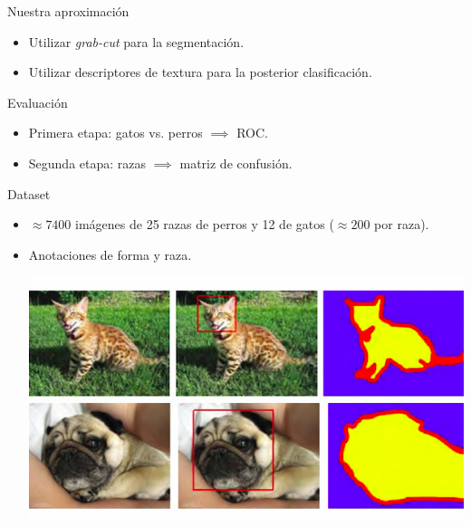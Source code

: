 \documentclass{beamer}
\begin{document}
\begin{frame}{Nuestra aproximación}
    \begin{itemize}
        \item Utilizar \emph{grab-cut} para la segmentación.
            \pause
        \item Utilizar descriptores de textura para la posterior
            clasificación.
    \end{itemize}
\end{frame}
\begin{frame}{Evaluación}
    \begin{itemize}
        \item Primera etapa: gatos vs. perros $\implies$ ROC.
            \pause
        \item Segunda etapa: razas $\implies$ matriz de confusión.
    \end{itemize}
\end{frame}
\begin{frame}{Dataset}
    \begin{itemize}
        \item $\approx 7400$ imágenes de 25 razas de perros y 12 de gatos
            ($\approx 200$ por raza).
            \pause
        \item Anotaciones de forma y raza.
            \pause
            \begin{center}
                \includegraphics[scale=0.3]{imagen/catsanddogs_annotation}
            \end{center}
    \end{itemize}
\end{frame}
\end{document}
